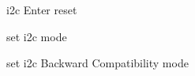 \begin{DoxyItemize}
\item i2c Enter reset ~\newline
~\newline
~\newline
~\newline
~\newline
~\newline
~\newline
~\newline
~\newline
~\newline
~\newline
~\newline
~\newline
~\newline
~\newline
~\newline

\item set i2c mode ~\newline
~\newline
~\newline
~\newline
~\newline
~\newline
~\newline
~\newline
~\newline
~\newline
~\newline
~\newline
~\newline
~\newline
~\newline

\item set i2c Backward Compatibility mode ~\newline
~\newline
~\newline
~\newline
~\newline
~\newline
~\newline
~\newline
~\newline
~\newline
~\newline
~\newline
~\newline
~\newline


\end{DoxyItemize}
